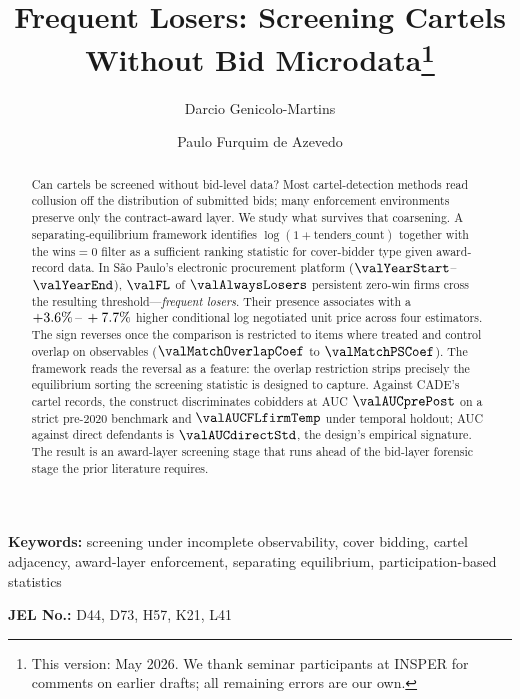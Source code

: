\begin{frontmatter}

\title{Frequent Losers: Screening Cartels Without Bid Microdata\texorpdfstring{\footnote{This version: May 2026. We thank seminar participants at INSPER for comments on earlier drafts; all remaining errors are our own.}}{}}

\author[insper]{Darcio Genicolo-Martins}
\author[insper]{Paulo Furquim de Azevedo}

\begin{abstract}
Can cartels be screened without bid-level data? Most
cartel-detection methods read collusion off the distribution of
submitted bids; many enforcement environments preserve only the
contract-award layer. We study what survives that coarsening.
A separating-equilibrium framework identifies
$\log(1+\text{tenders\_count})$ together with the
$\text{wins}=0$ filter as a sufficient ranking statistic for
cover-bidder type given award-record data. In São Paulo's
electronic procurement platform ($\valYearStart$--$\valYearEnd$),
$\valFL$ of $\valAlwaysLosers$ persistent zero-win firms cross
the resulting threshold---\emph{frequent losers}. Their presence
associates with a $+3.6\%\,\text{--}\,+7.7\%$ higher conditional log
negotiated unit price across four estimators. The sign reverses
once the comparison is restricted to items where treated and
control overlap on observables ($\valMatchOverlapCoef$ to
$\valMatchPSCoef$). The framework reads the reversal as a
feature: the overlap restriction strips precisely the
equilibrium sorting the screening statistic is designed to
capture. Against CADE's cartel records, the construct
discriminates cobidders at AUC $\valAUCprePost$ on a strict
pre-$2020$ benchmark and $\valAUCFLfirmTemp$ under temporal
holdout; AUC against direct defendants is $\valAUCdirectStd$,
the design's empirical signature. The result is an award-layer
screening stage that runs ahead of the bid-layer forensic stage
the prior literature requires.
\end{abstract}

\end{frontmatter}

\noindent\textbf{Keywords:} screening under incomplete observability, cover bidding, cartel adjacency, award-layer enforcement, separating equilibrium, participation-based statistics

\noindent\textbf{JEL No.:} D44, D73, H57, K21, L41

\bigskip
